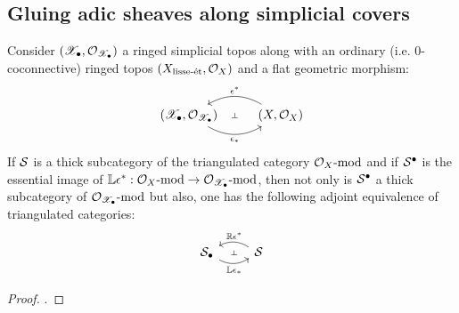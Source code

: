     \subsection{Gluing adic sheaves along simplicial covers}
        \begin{proposition}
            Consider $(\scrX_{\bullet}, \calO_{\scrX_{\bullet}})$ a ringed simplicial topos along with an ordinary (i.e. $0$-coconnective) ringed topos $(X_{\lisse\-\et}, \calO_X)$ and a flat geometric morphism:
                $$
                    \begin{tikzcd}
                    	{(\scrX_{\bullet}, \calO_{\scrX_{\bullet}})} & {(X, \calO_X)}
                    	\arrow[""{name=0, anchor=center, inner sep=0}, "{\e_*}"', bend right, from=1-1, to=1-2]
                    	\arrow[""{name=1, anchor=center, inner sep=0}, "{\e^*}"', bend right, from=1-2, to=1-1]
                    	\arrow["\dashv"{anchor=center, rotate=-90}, draw=none, from=1, to=0]
                    \end{tikzcd}
                $$
            If $\S$ is a thick subcategory of the triangulated category $\calO_X\mod$ and if $\S^{\bullet}$ is the essential image of $\L\e^*: \calO_X\mod \to \calO_{\scrX_{\bullet}}\mod$, then not only is $\S^{\bullet}$ a thick subcategory of $\calO_{\scrX_{\bullet}}\mod$ but also, one has the following adjoint equivalence of triangulated categories:
                $$
                    \begin{tikzcd}
                    	{\S_{\bullet}} & {\S}
                    	\arrow[""{name=0, anchor=center, inner sep=0}, "{\L\e_*}"', bend right, from=1-1, to=1-2]
                    	\arrow[""{name=1, anchor=center, inner sep=0}, "{\R\e^*}"', bend right, from=1-2, to=1-1]
                    	\arrow["\dashv"{anchor=center, rotate=-90}, draw=none, from=1, to=0]
                    \end{tikzcd}
                $$
        \end{proposition}
            \begin{proof}
                \cite[Lemma 2.2.2 and Theorem 2.2.3]{laszlo_olsson_adic_sheaves_on_artin_stacks_1}.
            \end{proof}
